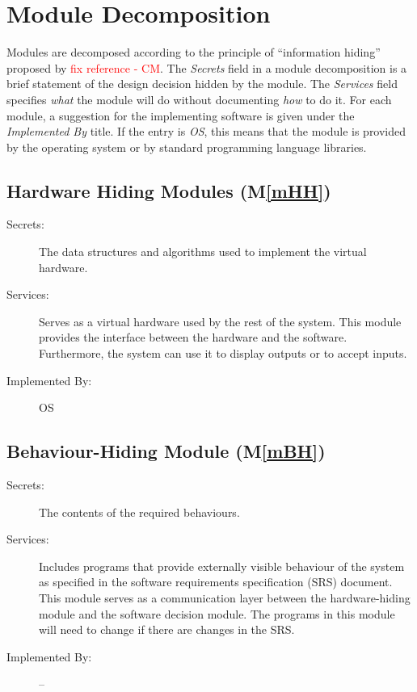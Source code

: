 \documentclass[12pt, titlepage]{article}
\newcommand{\mref}[1]{M\ref{#1}}
\begin{document}
\section{Module Decomposition} \label{SecMD}

Modules are decomposed according to the principle of ``information hiding''
proposed by \citet{ParnasEtAl1984} \textcolor{red}{fix reference - CM}. The \emph{Secrets} field in a module
decomposition is a brief statement of the design decision hidden by the
module. The \emph{Services} field specifies \emph{what} the module will do
without documenting \emph{how} to do it. For each module, a suggestion for the
implementing software is given under the \emph{Implemented By} title. If the
entry is \emph{OS}, this means that the module is provided by the operating
system or by standard programming language libraries.

\subsection{Hardware Hiding Modules (\mref{mHH})}

\begin{description}
\item[Secrets:]The data structures and algorithms used to implement the virtual
  hardware.
\item[Services:]Serves as a virtual hardware used by the rest of the
  system. This module provides the interface between the hardware and the
  software. Furthermore, the system can use it to display outputs or to accept inputs.
\item[Implemented By:] OS
\end{description}

\subsection{Behaviour-Hiding Module (\mref{mBH})}

\begin{description}
\item[Secrets:]The contents of the required behaviours.
\item[Services:]Includes programs that provide externally visible behaviour of
  the system as specified in the software requirements specification (SRS)
  document. This module serves as a communication layer between the
  hardware-hiding module and the software decision module. The programs in this
  module will need to change if there are changes in the SRS.
\item[Implemented By:] --
\end{description}
\end{document}
